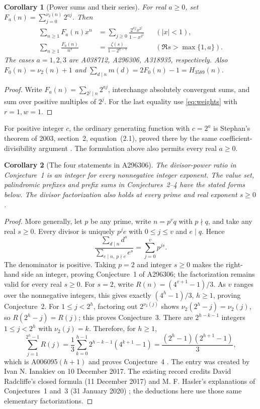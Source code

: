 \documentclass[11pt]{article}
\newtheorem{corollary}{Corollary}
\newcommand{\val}{\nu_2}
\begin{document}
\begin{corollary}[Power sums and their series]\label{cor:series}
For real $a\geq0$, set $F_a(n)=\sum_{j=0}^{\val(n)}2^{aj}$.
Then
\begin{align*}
 \sum_{n\geq1}F_a(n)x^n
 &=\sum_{j\geq0}\frac{2^{aj}x^{2^j}}{1-x^{2^j}}
 &&(|x|<1),\\
 \sum_{n\geq1}\frac{F_a(n)}{n^s}
 &=\frac{\zeta(s)}{1-2^{a-s}}
 &&(\Re s>\max\{1,a\}).
\end{align*}
The cases $a=1,2,3$ are A038712, A296306, A318935, respectively.
Also $F_0(n)=\val(n)+1$
and $\sum_{d\mid n}m(d)=2F_0(n)-1=H_{3589}(n)$.
\end{corollary}
\begin{proof}
Write $F_a(n)=\sum_{2^j\mid n}2^{aj}$, interchange absolutely convergent
sums, and sum over positive multiples of $2^j$. For the last equality
use \eqref{eq:weights} with $r=1,w=1$.
\end{proof}
For positive integer $c$, the ordinary generating function with $c=2^a$
is Stephan's theorem of 2003, section~2, equation~(2.1), proved there by
the same coefficient-divisibility argument \cite{stephan}.
The formulation above also permits every real $a\geq0$.

\begin{corollary}[The four statements in A296306]\label{cor:ratio}
The divisor-power ratio in Conjecture~1 is an integer for every
nonnegative integer exponent. The value set, palindromic prefixes and
prefix sums in Conjectures~2--4 have the stated forms below.
The divisor factorization also holds at every prime and real exponent
$s\geq0$.
\end{corollary}
\begin{proof}
More generally, let $p$ be any prime, write $n=p^vq$ with $p\nmid q$,
and take any real $s\geq0$. Every divisor is uniquely $p^je$ with
$0\leq j\leq v$ and $e\mid q$. Hence
\begin{equation}\label{eq:ratio}
\frac{\sum_{d\mid n}d^s}{\sum_{e\mid n,\ p\nmid e}e^s}
=\sum_{j=0}^vp^{js}.
\end{equation}
The denominator is positive. Taking $p=2$ and integer $s\geq0$ makes
the right-hand side an integer, proving Conjecture~1 of A296306;
the factorization remains valid for every real $s\geq0$. For $s=2$, write
$R(n)=(4^{v+1}-1)/3$. As $v$ ranges over the nonnegative integers, this
gives exactly $(4^h-1)/3$, $h\geq1$, proving Conjecture~2.
For $1\leq j<2^h$, factoring out $2^{\val(j)}$ shows
$\val(2^h-j)=\val(j)$, so $R(2^h-j)=R(j)$; this proves Conjecture~3.
There are $2^{h-k-1}$ integers $1\leq j<2^h$ with $\val(j)=k$.
Therefore, for $h\geq1$,
\[
\sum_{j=1}^{2^h-1}R(j)
=\frac13\sum_{k=0}^{h-1}2^{h-k-1}(4^{k+1}-1)
=\frac{(2^h-1)(2^{h+1}-1)}3,
\]
which is A006095$(h+1)$ and proves Conjecture~4 \cite{gaussian}.
The entry was created by Ivan N. Ianakiev on 10 December 2017.
The existing record credits David Radcliffe's closed formula
(11 December 2017) and M. F. Hasler's explanations of Conjectures~1 and~3
(31 January 2020) \cite{ratio}; the deductions here use those same
elementary factorizations.
\end{proof}
\end{document}
